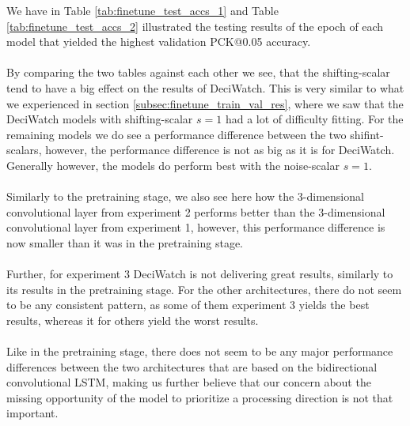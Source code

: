 \documentclass[./main.tex]{subfiles}
\begin{document}
\noindent We have in Table \ref{tab:finetune_test_accs_1} and Table \ref{tab:finetune_test_accs_2} illustrated the testing results of the epoch of each model that yielded the highest validation PCK@0.05 accuracy.
\\
\\
By comparing the two tables against each other we see, that the shifting-scalar tend to have a big effect on the results of DeciWatch. This is very similar to what we experienced in section \ref{subsec:finetune_train_val_res}, where we saw that the DeciWatch models with shifting-scalar $s = 1$ had a lot of difficulty fitting. For the remaining models we do see a performance difference between the two shifint-scalars, however, the performance difference is not as big as it is for DeciWatch. Generally however, the models do perform best with the noise-scalar $s = 1$.
\\
\\
Similarly to the pretraining stage, we also see here how the 3-dimensional convolutional layer from experiment 2 performs better than the 3-dimensional convolutional layer from experiment 1, however, this performance difference is now smaller than it was in the pretraining stage.
\\
\\
Further, for experiment 3 DeciWatch is not delivering great results, similarly to its results in the pretraining stage. For the other architectures, there do not seem to be any consistent pattern, as some of them experiment 3 yields the best results, whereas it for others yield the worst results.
\\
\\
Like in the pretraining stage, there does not seem to be any major performance differences between the two architectures that are based on the bidirectional convolutional LSTM, making us further believe that our concern about the missing opportunity of the model to prioritize a processing direction is not that important.
\end{document}
